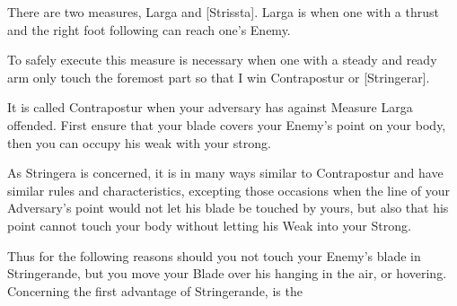 \newpage


\newpage


 There are two measures, Larga and [Strissta]. Larga is when one with
 a thrust and the right foot following can reach one's Enemy.

To safely execute this measure is necessary when one with a steady and
ready arm only touch the foremost part so that I win Contrapostur or
[Stringerar].

It is called Contrapostur when your adversary has against Measure
Larga offended. First ensure that your blade covers your Enemy's point
on your body, then you can occupy his weak with your strong.

%
As Stringera is concerned, it is in many ways similar to Contrapostur
and have similar rules and characteristics, excepting those occasions
when the line of your Adversary's point would not let his blade be
touched by yours, but also that his point cannot touch your body
without letting his Weak into your Strong.

Thus for the following reasons should you not touch your Enemy's blade
in Stringerande, but you move your Blade over his hanging in the
air, or hovering. Concerning the first
advantage of Stringerande, is the 